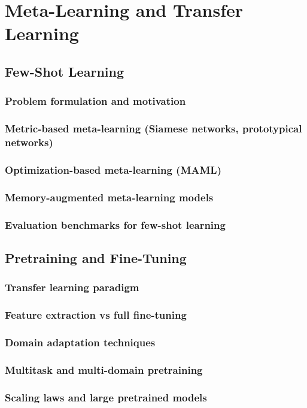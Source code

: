 ﻿\chapter{Meta-Learning and Transfer Learning}
\section{Few-Shot Learning}
\subsection{Problem formulation and motivation}
\subsection{Metric-based meta-learning (Siamese networks, prototypical networks)}
\subsection{Optimization-based meta-learning (MAML)}
\subsection{Memory-augmented meta-learning models}
\subsection{Evaluation benchmarks for few-shot learning}

\section{Pretraining and Fine-Tuning}
\subsection{Transfer learning paradigm}
\subsection{Feature extraction vs full fine-tuning}
\subsection{Domain adaptation techniques}
\subsection{Multitask and multi-domain pretraining}
\subsection{Scaling laws and large pretrained models}

